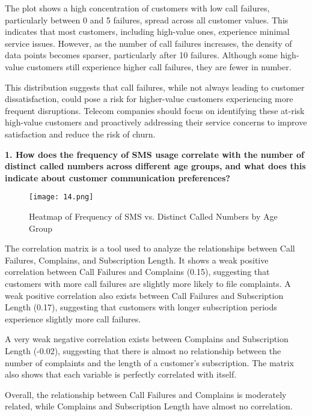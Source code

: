 \documentclass[12pt]{article}
\begin{document}
The plot shows a high concentration of customers with low call failures, particularly between 0 and 5 failures, spread across all customer values. This indicates that most customers, including high-value ones, experience minimal service issues. However, as the number of call failures increases, the density of data points becomes sparser, particularly after 10 failures. Although some high-value customers still experience higher call failures, they are fewer in number.

This distribution suggests that call failures, while not always leading to customer dissatisfaction, could pose a risk for higher-value customers experiencing more frequent disruptions. Telecom companies should focus on identifying these at-risk high-value customers and proactively addressing their service concerns to improve satisfaction and reduce the risk of churn.


\vspace{0.5cm}
\textbf{1. How does the frequency of SMS usage correlate with the number of distinct called numbers across different age groups, and what does this indicate about customer communication preferences?}
\begin{figure}[h]
    \centering
    \texttt{[image: 14.png]}  
    \caption{Heatmap of Frequency of SMS vs. Distinct Called Numbers by Age
Group}
\end{figure}
\FloatBarrier
The correlation matrix is a tool used to analyze the relationships between Call Failures, Complains, and Subscription Length. It shows a weak positive correlation between Call Failures and Complains (0.15), suggesting that customers with more call failures are slightly more likely to file complaints. A weak positive correlation also exists between Call Failures and Subscription Length (0.17), suggesting that customers with longer subscription periods experience slightly more call failures.

A very weak negative correlation exists between Complains and Subscription Length (-0.02), suggesting that there is almost no relationship between the number of complaints and the length of a customer's subscription. The matrix also shows that each variable is perfectly correlated with itself.

Overall, the relationship between Call Failures and Complains is moderately related, while Complains and Subscription Length have almost no correlation.
\end{document}
